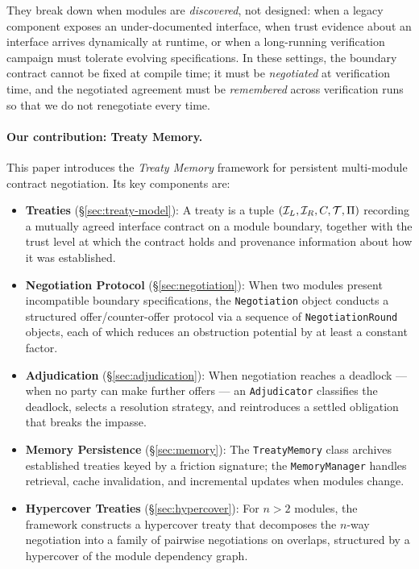\documentclass[11pt]{article}
\newcommand{\Iface}{\mathcal{I}}          %
\begin{document}
They break down when modules are \emph{discovered}, not designed:
when a legacy component exposes an under-documented interface, when
trust evidence about an interface arrives dynamically at runtime, or
when a long-running verification campaign must tolerate evolving
specifications.  In these settings, the boundary contract cannot be
fixed at compile time; it must be \emph{negotiated} at verification
time, and the negotiated agreement must be \emph{remembered} across
verification runs so that we do not renegotiate every time.

\paragraph{Our contribution: Treaty Memory.}
This paper introduces the \emph{Treaty Memory} framework for
persistent multi-module contract negotiation.  Its key components are:

\begin{itemize}[leftmargin=*]
\item \textbf{Treaties} (\S\ref{sec:treaty-model}): A treaty is a
  tuple $(\Iface_L, \Iface_R, C, \trust, \prov)$ recording a mutually
  agreed interface contract on a module boundary, together with the
  trust level at which the contract holds and provenance information
  about how it was established.

\item \textbf{Negotiation Protocol} (\S\ref{sec:negotiation}): When
  two modules present incompatible boundary specifications, the
  \texttt{Negotiation} object conducts a structured offer/counter-offer
  protocol via a sequence of \texttt{NegotiationRound} objects,
  each of which reduces an obstruction potential by at least a
  constant factor.

\item \textbf{Adjudication} (\S\ref{sec:adjudication}): When
  negotiation reaches a deadlock — when no party can make further
  offers — an \texttt{Adjudicator} classifies the deadlock, selects a
  resolution strategy, and reintroduces a settled obligation that
  breaks the impasse.

\item \textbf{Memory Persistence} (\S\ref{sec:memory}): The
  \texttt{TreatyMemory} class archives established treaties keyed
  by a friction signature; the \texttt{MemoryManager} handles
  retrieval, cache invalidation, and incremental updates when modules
  change.

\item \textbf{Hypercover Treaties} (\S\ref{sec:hypercover}): For
  $n > 2$ modules, the framework constructs a hypercover treaty that
  decomposes the $n$-way negotiation into a family of pairwise
  negotiations on overlaps, structured by a hypercover of the
  module dependency graph.
\end{itemize}
\end{document}
